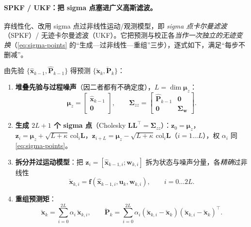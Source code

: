 \paragraph{SPKF / UKF：把 sigma 点塞进广义高斯滤波。}
弃线性化、改用 sigma 点过非线性运动/观测模型，即 \emph{sigma 点卡尔曼滤波}（SPKF）/ 无迹卡尔曼滤波（UKF）\cite{barfoot2024state}。它把预测与校正各\emph{当作一次独立的无迹变换}（\cref{eq:sigma-points} 的“生成—过非线性—重组”三步），逐式如下，满足“每步不删减”。

\begin{algo}\label{algo:spkf-predict}
由先验 $\{\hat{\mathbf{x}}_{k-1},\hat{\mathbf{P}}_{k-1}\}$ 得预测 $\{\check{\mathbf{x}}_k,\check{\mathbf{P}}_k\}$\cite{barfoot2024state}：
\begin{enumerate}
  \item \textbf{堆叠先验与过程噪声}（因二者都有不确定度），$L=\dim\boldsymbol{\mu}_z$：
  \begin{equation}
    \boldsymbol{\mu}_z=\begin{bmatrix}\hat{\mathbf{x}}_{k-1}\\\mathbf{0}\end{bmatrix},\qquad
    \boldsymbol{\Sigma}_{zz}=\begin{bmatrix}\hat{\mathbf{P}}_{k-1}&\mathbf{0}\\\mathbf{0}&\boldsymbol{\Sigma}_{\mathbf{w}}\end{bmatrix}.
    \label{eq:spkf-pred-stack}
  \end{equation}
  \item \textbf{生成 $2L+1$ 个 sigma 点}（Cholesky $\mathbf{L}\mathbf{L}^\top=\boldsymbol{\Sigma}_{zz}$）：$\mathbf{z}_0=\boldsymbol{\mu}_z$，$\mathbf{z}_i=\boldsymbol{\mu}_z+\sqrt{L+\kappa}\,\mathrm{col}_i\mathbf{L}$，$\mathbf{z}_{i+L}=\boldsymbol{\mu}_z-\sqrt{L+\kappa}\,\mathrm{col}_i\mathbf{L}$（$i=1\dots L$），权 $\alpha_i$ 同 \cref{eq:sigma-points}。
  \item \textbf{拆分并过运动模型}：把 $\mathbf{z}_i=[\hat{\mathbf{x}}_{k-1,i};\mathbf{w}_{k,i}]$ 拆为状态与噪声分量，各\emph{精确}过非线性
  \begin{equation}
    \check{\mathbf{x}}_{k,i}=\mathbf{f}(\hat{\mathbf{x}}_{k-1,i},\mathbf{u}_k,\mathbf{w}_{k,i}),\qquad i=0\dots 2L.
    \label{eq:spkf-pred-pass}
  \end{equation}
  \item \textbf{重组预测矩}：
  \begin{equation}
    \check{\mathbf{x}}_k=\sum_{i=0}^{2L}\alpha_i\,\check{\mathbf{x}}_{k,i},\qquad
    \check{\mathbf{P}}_k=\sum_{i=0}^{2L}\alpha_i(\check{\mathbf{x}}_{k,i}-\check{\mathbf{x}}_k)(\check{\mathbf{x}}_{k,i}-\check{\mathbf{x}}_k)^\top.
    \label{eq:spkf-pred-recombine}
  \end{equation}
\end{enumerate}
\end{algo}

